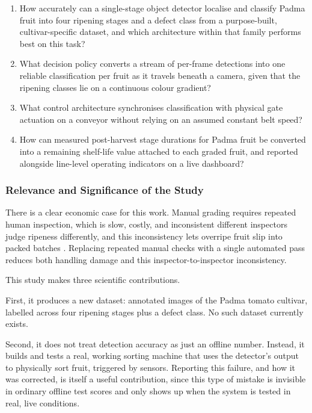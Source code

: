 \begin{enumerate}
    \item How accurately can a single-stage object detector localise and classify Padma fruit into four ripening stages and a defect class from a purpose-built, cultivar-specific dataset, and which architecture within that family performs best on this task?
    \item What decision policy converts a stream of per-frame detections into one reliable classification per fruit as it travels beneath a camera, given that the ripening classes lie on a continuous colour gradient?
    \item What control architecture synchronises classification with physical gate actuation on a conveyor without relying on an assumed constant belt speed?
    \item How can measured post-harvest stage durations for Padma fruit be converted into a remaining shelf-life value attached to each graded fruit, and reported alongside line-level operating indicators on a live dashboard?
\end{enumerate}

\subsubsection{Relevance and Significance of the Study}
\label{sec:significance}

There is a clear economic case for this work. Manual grading requires repeated human inspection, which is slow, costly, and inconsistent different inspectors judge ripeness differently, and this inconsistency lets overripe fruit slip into packed batches \citep{abekoon2024}. Replacing repeated manual checks with a single automated pass reduces both handling damage and this inspector-to-inspector inconsistency.

This study makes three scientific contributions.

First, it produces a new dataset: annotated images of the Padma tomato cultivar, labelled across four ripening stages plus a defect class. No such dataset currently exists.

Second, it does not treat detection accuracy as just an offline number. Instead, it builds and tests a real, working sorting machine that uses the detector's output to physically sort fruit, triggered by sensors. Reporting this failure, and how it was corrected, is itself a useful contribution, since this type of mistake is invisible in ordinary offline test scores and only shows up when the system is tested in real, live conditions.

